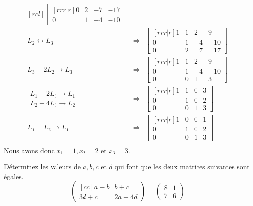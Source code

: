 \begin{exemple}
\[\begin{matrix}[rcl]
\begin{bmatrix}[rrr|r]
        0 & 2 & -7 & -17 \\
        0 & 1 & -4 & -10
        \end{bmatrix} \\[20pt]
        L_2 \leftrightarrow L_3
        &\Longrightarrow&
        \begin{bmatrix}[rrr|r]
        1 & 1 & 2 & 9 \\
        0 & 1 & -4 & -10 \\
        0 & 2 & -7 & -17
        \end{bmatrix} \\[20pt]
        L_3 - 2L_2 \rightarrow L_3
        &\Longrightarrow&
        \begin{bmatrix}[rrr|r]
        1 & 1 & 2 & 9 \\
        0 & 1 & -4 & -10 \\
        0 & 0 & 1 & 3
        \end{bmatrix} \\[20pt]
        \begin{matrix}
        L_1 - 2L_3 \rightarrow L_1 \\
        L_2 + 4L_3 \rightarrow L_2
        \end{matrix}
        &\Longrightarrow&
        \begin{bmatrix}[rrr|r]
        1 & 1 & 0 & 3 \\
        0 & 1 & 0 & 2 \\
        0 & 0 & 1 & 3
        \end{bmatrix} \\[20pt]
        L_1 - L_2 \rightarrow L_1
        &\Longrightarrow&
        \begin{bmatrix}[rrr|r]
        1 & 0 & 0 & 1 \\
        0 & 1 & 0 & 2 \\
        0 & 0 & 1 & 3
        \end{bmatrix} \\[20pt]
    \end{matrix}
    \]
     Nous avons donc $x_1 = 1, x_2=2$ et $x_3=3$.
\end{exemple}
\begin{exerciceB}
Déterminez les valeurs de $a, b, c$ et $d$ qui font que les
deux matrices suivantes sont égales.
\[
\begin{pmatrix}[cc]
a-b & b+c\\
3d+c & 2a-4d
\end{pmatrix}
=
\begin{pmatrix}
8 & 1 \\
7 & 6
\end{pmatrix}
\]
\end{exerciceB}

